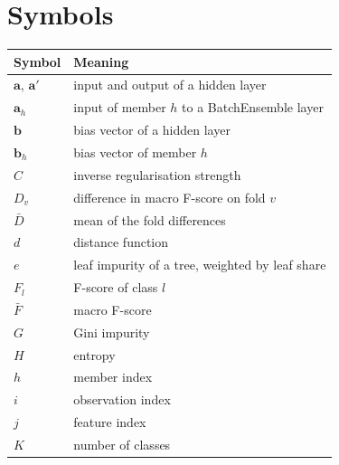 \documentclass[conference]{IEEEtran}
\begin{document}
\section{Symbols}
\footnotesize
\begin{tabular}{@{}ll@{}}
    \toprule
    Symbol                         & Meaning                                          \\
    \midrule
    $\mathbf{a}$, $\mathbf{a}'$    & input and output of a hidden layer               \\
    $\mathbf{a}_h$                 & input of member $h$ to a BatchEnsemble layer     \\
    $\mathbf{b}$                   & bias vector of a hidden layer                    \\
    $\mathbf{b}_h$                 & bias vector of member $h$                        \\
    $C$                            & inverse regularisation strength                  \\
    $D_v$                          & difference in macro F-score on fold $v$          \\
    $\bar{D}$                      & mean of the fold differences                     \\
    $d$                            & distance function                                \\
    $e$                            & leaf impurity of a tree, weighted by leaf share       \\
    $F_l$                          & F-score of class $l$                             \\
    $\bar{F}$                      & macro F-score                                    \\
    $G$                            & Gini impurity                                    \\
    $H$                            & entropy                                          \\
    $h$                            & member index                                     \\
    $i$                            & observation index                                        \\
    $j$                            & feature index                                    \\
    $K$                            & number of classes                                \\

\end{tabular}
\end{document}
